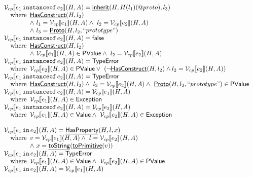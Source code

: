 \documentclass{article}
\makeatletter
\newcommand{\SF}[1]{\mbox{\textsf{#1}}}
\newcommand{\TT}[1]{\mbox{\texttt{#1}}}
\newcommand{\wherec}[1]{{\rm where}\begin{array}[t]{l}#1\end{array}}
\newcommand{\Value}{\SF{Value}}
\newcommand{\PValue}{\SF{PValue}}
\newcommand{\V}{\mathcal{V}}
\newcommand{\lbr}{\llbracket}
\newcommand{\rbr}{\rrbracket}
\newcommand{\hf}[1]{\underline{\sf #1}}
\newcommand{\exc}[1]{{\sf #1}}
\newcommand{\varprop}[1]{@#1}
\newcommand{\vfalse}{\SF{false}}
\makeatother
\begin{document}
\[\begin{array}{ll}
\V_{cp}\lbr e_1\,\TT{instanceof}\,e_2 \rbr (H,A) = \hf{inherit}(H,H(l_1)(\varprop{proto}),l_3) \\
\quad\wherec{
  \hf{HasConstruct}(H,l_2) \\
  \land\ l_1 = \V_{cp}\lbr e_1 \rbr (H,A)
  \land\ l_2 = \V_{cp}\lbr e_2 \rbr (H,A) \\
  \land\ l_3 = \hf{Proto}(H,l_2,``prototype")
}
\\
\V_{cp}\lbr e_1\,\TT{instanceof}\,e_2 \rbr (H,A) = \vfalse \\
\quad\wherec{
  \hf{HasConstruct}(H,l_2) \\
  \land\ \V_{cp}\lbr e_1 \rbr (H,A)\in\PValue
  \land\ l_2 = \V_{cp}\lbr e_2 \rbr (H,A) \\
}
\\
\V_{cp}\lbr e_1\,\TT{instanceof}\,e_2 \rbr (H,A)
 = \exc{TypeError} \\
\quad\wherec{
  \V_{cp}\lbr e_2\rbr (H,A)\in\PValue
  \lor\ 
  \left(\lnot\hf{HasConstruct}(H,l_2) \land l_2 = \V_{cp}\lbr e_2 \rbr (H,A)\right)
}
\\
\V_{cp}\lbr e_1\,\TT{instanceof}\,e_2 \rbr (H,A)
 = \exc{TypeError} \\
\quad\wherec{
  \hf{HasConstruct}(H,l_2)
  \land\ l_2 = \V_{cp}\lbr e_2 \rbr (H,A)
  \land\ \hf{Proto}(H,l_2,``prototype")\in\PValue
}
\\
\V_{cp}\lbr e_1\,\TT{instanceof}\,e_2 \rbr (H,A)
 = \V_{cp}\lbr e_1\rbr(H,A) \\
\quad\wherec{
  \V_{cp}\lbr e_1\rbr(H,A) \in \SF{Exception}
}
\\
\V_{cp}\lbr e_1\,\TT{instanceof}\,e_2 \rbr (H,A)
 = \V_{cp}\lbr e_2\rbr(H,A) \\
\quad\wherec{
  \V_{cp}\lbr e_1\rbr(H,A) \in \Value
  \land\ \V_{cp}\lbr e_2\rbr(H,A) \in \SF{Exception}
}
\\\\
\V_{cp}\lbr e_1\,\TT{in}\,e_2 \rbr (H,A)= \hf{HasProperty}(H,l,x)\\
\quad\wherec{
  v = \V_{cp}\lbr e_1\rbr(H,A)
  \land\ l = \V_{cp}\lbr e_2\rbr(H,A) \\
  \land\ x = \hf{toString}(\hf{toPrimitive}(v))
}
\\
\V_{cp}\lbr e_1\,\TT{in}\,e_2 \rbr (H,A)
 = \exc{TypeError} \\
\quad\wherec{
  \V_{cp}\lbr e_1\rbr(H,A) \in \Value
  \land\ \V_{cp}\lbr e_2\rbr(H,A)\in\PValue
}
\\
\V_{cp}\lbr e_1\,\TT{in}\,e_2 \rbr (H,A)
 = \V_{cp}\lbr e_1\rbr(H,A) \\

\end{array}\]
\end{document}
